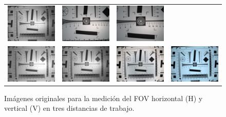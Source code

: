 \begin{figure}[H]
\begin{tabular}{cccc}
        \includegraphics[trim= 6cm 6cm 6cm 6cm, clip, width=.22\linewidth]{Figures/C4/FOV/NIR/V/65.png} & %
        \includegraphics[width=.22\linewidth]{Figures/C4/FOV/VIS/H/37_8.png} &
        \includegraphics[width=.22\linewidth]{Figures/C4/FOV/VIS/V/30_3.png} \\
        \includegraphics[width=.22\linewidth]{Figures/C4/FOV/NIR/H/63.png} &
        \includegraphics[width=.22\linewidth]{Figures/C4/FOV/NIR/V/65.png} &
        \includegraphics[width=.22\linewidth]{Figures/C4/FOV/VIS/H/69_4.png} &
        \includegraphics[width=.22\linewidth]{Figures/C4/FOV/VIS/V/70.png} \\
      \end{tabular}
      \caption{Imágenes originales para la medición del FOV horizontal (H)
               y vertical (V) en tres distancias de trabajo.}
      \label{fig:fov_montage}
    \end{figure}
    
